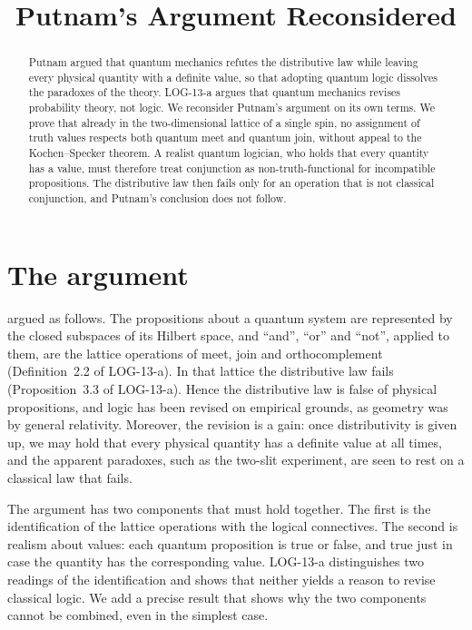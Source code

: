 \documentclass{situationist-preprint}
\title{Putnam's Argument Reconsidered}
\begin{document}
\maketitle

\begin{abstract}
Putnam argued that quantum mechanics refutes the distributive law while leaving every physical quantity with a definite value, so that adopting quantum logic dissolves the paradoxes of the theory. LOG-13-a argues that quantum mechanics revises probability theory, not logic. We reconsider Putnam's argument on its own terms. We prove that already in the two-dimensional lattice of a single spin, no assignment of truth values respects both quantum meet and quantum join, without appeal to the Kochen--Specker theorem. A realist quantum logician, who holds that every quantity has a value, must therefore treat conjunction as non-truth-functional for incompatible propositions. The distributive law then fails only for an operation that is not classical conjunction, and Putnam's conclusion does not follow.
\end{abstract}

\section{The argument}

\citet{Putnam1968} argued as follows. The propositions about a quantum system are represented by the closed subspaces of its Hilbert space, and \enquote{and}, \enquote{or} and \enquote{not}, applied to them, are the lattice operations of meet, join and orthocomplement (Definition~2.2 of LOG-13-a). In that lattice the distributive law fails (Proposition~3.3 of LOG-13-a). Hence the distributive law is false of physical propositions, and logic has been revised on empirical grounds, as geometry was by general relativity. Moreover, the revision is a gain: once distributivity is given up, we may hold that every physical quantity has a definite value at all times, and the apparent paradoxes, such as the two-slit experiment, are seen to rest on a classical law that fails.

The argument has two components that must hold together. The first is the identification of the lattice operations with the logical connectives. The second is realism about values: each quantum proposition is true or false, and true just in case the quantity has the corresponding value. LOG-13-a distinguishes two readings of the identification and shows that neither yields a reason to revise classical logic. We add a precise result that shows why the two components cannot be combined, even in the simplest case.
\end{document}
